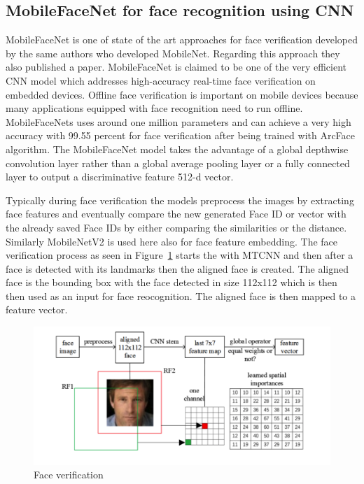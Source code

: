 \subsection{MobileFaceNet for face recognition using CNN}
MobileFaceNet is one of state of the art approaches for face verification developed by the same authors who developed MobileNet. Regarding this approach they also published a paper. MobileFaceNet is claimed to be one of the very efficient CNN model which addresses high-accuracy real-time face verification on embedded devices. Offline face verification is important on mobile devices because many applications equipped with face recognition need to run offline. 
MobileFaceNets uses around one million parameters and can achieve a very high accuracy with 99.55 percent for face verification after being trained with ArcFace algorithm. The MobileFaceNet model takes the advantage of a global
depthwise convolution layer rather than a global average pooling layer or a fully
connected layer to output a discriminative feature 512-d vector. 

Typically during face verification the models preprocess the images by extracting face features and eventually compare the new generated Face ID or vector with the already saved Face IDs by either comparing the similarities or the distance. Similarly MobileNetV2 is used here also for face feature embedding. The face verification process as seen in Figure~\ref{fig:face_ver} starts the with MTCNN and then after a face is detected with its landmarks then the aligned face is created. The aligned face is the bounding box with the face detected in size 112x112 which is then then used as an input for face reocognition. The aligned face is then mapped to a feature vector. 


\begin{figure}[!htb]
    \centering
    \includegraphics[width=1\textwidth]{figures/face_recognition.png}
    \caption{Face verification}
    \label{fig:face_ver}
\end{figure}

